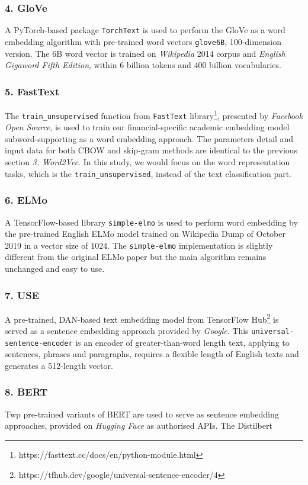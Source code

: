 \subsubsection{4. GloVe}
A PyTorch-based package \texttt{TorchText} is used to perform the GloVe as a word embedding algorithm with pre-trained word vectors \texttt{glove\.6B}, 100-dimension version.
The 6B word vector is trained on \textit{Wikipedia} 2014 corpus and \textit{English Gigaword Fifth Edition}\cite{Gigaword5}, within 6 billion tokens and 400 billion vocabularies.

\subsubsection{5. FastText}
The \texttt{train_unsupervised} function from \texttt{FastText} library\footnote{https://fasttext.cc/docs/en/python-module.html}, presented by \textit{Facebook Open Source}, is used to train our financial-specific academic embedding model subword-supporting as a word embedding approach.
The parameters detail and input data for both CBOW and skip-gram methods are identical to the previous section \textit{3. Word2Vec}.
In this study, we would focus on the word representation tasks, which is the \texttt{train_unsupervised}, instead of the text classification part.

\subsubsection{6. ELMo}
A TensorFlow-based library \texttt{simple-elmo} is used to perform word embedding by the pre-trained English ELMo model trained on Wikipedia Dump of October 2019 in a vector size of 1024.
The \texttt{simple-elmo} implementation is slightly different from the original ELMo paper but the main algorithm remains unchanged and easy to use.

\subsubsection{7. USE}
A pre-trained, DAN-based text embedding model from TensorFlow Hub\footnote{https://tfhub.dev/google/universal-sentence-encoder/4} is served as a sentence embedding approach provided by \textit{Google}.
This \texttt{universal-sentence-encoder} is an encoder of greater-than-word length text, applying to sentences, phrases and paragraphs, requires a flexible length of English texts and generates a 512-length vector.

\subsubsection{8. BERT}
Twp pre-trained variants of BERT are used to serve as sentence embedding approaches, provided on \textit{Hugging Face} as authorised APIs.
The Distilbert 